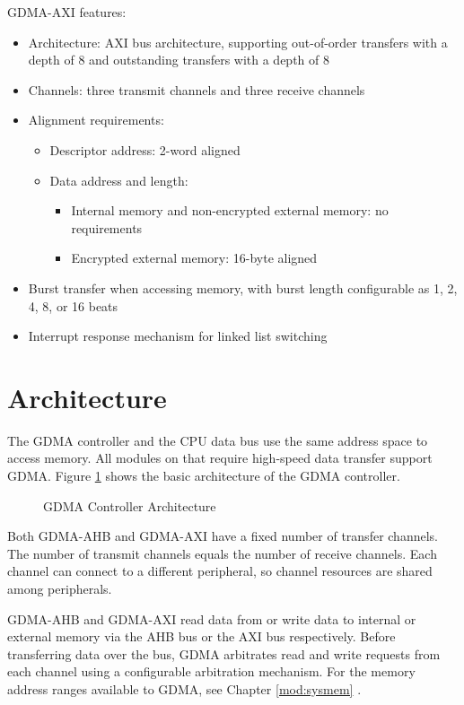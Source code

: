 \documentclass[main\_\_EN.tex]{subfiles}
\begin{document}
GDMA-AXI features:

\begin{itemize}
    \item Architecture: AXI bus architecture, supporting out-of-order transfers with a depth of 8 and outstanding transfers with a depth of 8
    \item Channels: three transmit channels and three receive channels
    \item Alignment requirements:
        \begin{itemize}
            \item Descriptor address: 2-word aligned
            \item Data address and length:
                \begin{itemize}
                    \item Internal memory and non-encrypted external memory: no requirements
                    \item Encrypted external memory: 16-byte aligned
                \end{itemize}
        \end{itemize}
    \item Burst transfer when accessing memory, with burst length configurable as 1, 2, 4, 8, or 16 beats
    \item Interrupt response mechanism for linked list switching
\end{itemize}


\section{Architecture}

The GDMA controller and the CPU data bus use the same address space to access memory. All modules on \chipname{} that require high-speed data transfer support GDMA. Figure \ref{fig:gdma-controller} shows the basic architecture of the GDMA controller.

\begin{figure}[H]

\centering
\caption{GDMA Controller Architecture}
\label{fig:gdma-controller}
\end{figure}

Both GDMA-AHB and GDMA-AXI have a fixed number of transfer channels. The number of transmit channels equals the number of receive channels. Each channel can connect to a different peripheral, so channel resources are shared among peripherals.

GDMA-AHB and GDMA-AXI read data from or write data to internal or external memory via the AHB bus or the AXI bus respectively. Before transferring data over the bus, GDMA arbitrates read and write requests from each channel using a configurable arbitration mechanism. For the memory address ranges available to GDMA, see Chapter \ref{mod:sysmem} \textit{}.
\end{document}
